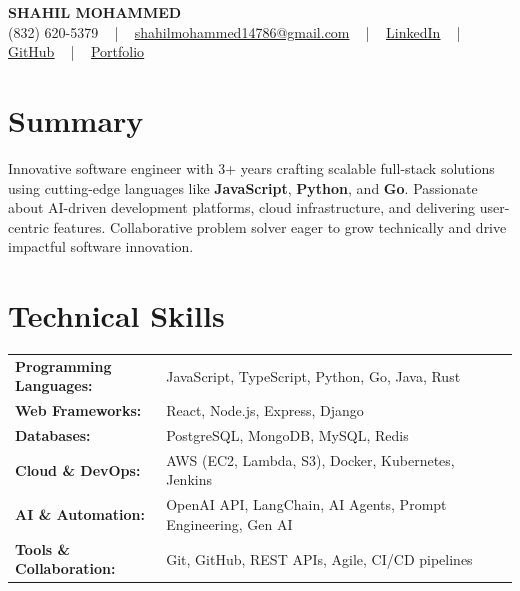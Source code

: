 \documentclass[letterpaper,11pt]{article}
\begin{document}
\begin{center}
    {\fontsize{14pt}{12pt}\selectfont \textbf{\MakeUppercase{Shahil Mohammed}}}\\ \vspace{2pt}
    \fontsize{10pt}{12pt}\selectfont (832) 620-5379 ~ | ~ \href{mailto:shahilmohammed14786@gmail.com}{shahilmohammed14786@gmail.com} ~ | ~  
    \href{https://www.linkedin.com/in/shahil-mohammed-9652931a1/}{\color{blue}\underline{LinkedIn}}  ~ | ~ 
    \href{https://github.com/freakbeast14}{\color{blue}\underline{GitHub}} ~ | ~ 
    \href{https://shahil-mohammed.netlify.app/}{\color{blue}\underline{Portfolio}}
    \vspace{-8pt}
\end{center}

\section{Summary}
\fontsize{9pt}{10pt}\selectfont
Innovative software engineer with 3+ years crafting scalable full-stack solutions using cutting-edge languages like \textbf{JavaScript}, \textbf{Python}, and \textbf{Go}. Passionate about AI-driven development platforms, cloud infrastructure, and delivering user-centric features. Collaborative problem solver eager to grow technically and drive impactful software innovation.

 \vspace{-5pt}
 
\section{Technical Skills}
        \vspace{-14pt}
        \begin{table}[h]
            \fontsize{9pt}{10pt}\selectfont
            \begin{tabular}{p{0.3\linewidth} p{0.7\linewidth}}
                \textbf{Programming Languages:} & JavaScript, TypeScript, Python, Go, Java, Rust \\
                \textbf{Web Frameworks:} & React, Node.js, Express, Django \\
                \textbf{Databases:} & PostgreSQL, MongoDB, MySQL, Redis \\
                \textbf{Cloud \& DevOps:} & AWS (EC2, Lambda, S3), Docker, Kubernetes, Jenkins \\
                \textbf{AI \& Automation:} & OpenAI API, LangChain, AI Agents, Prompt Engineering, Gen AI \\
                \textbf{Tools \& Collaboration:} & Git, GitHub, REST APIs, Agile, CI/CD pipelines \\
            \end{tabular}
        \end{table}
 \vspace{-15pt}
 
\end{document}
